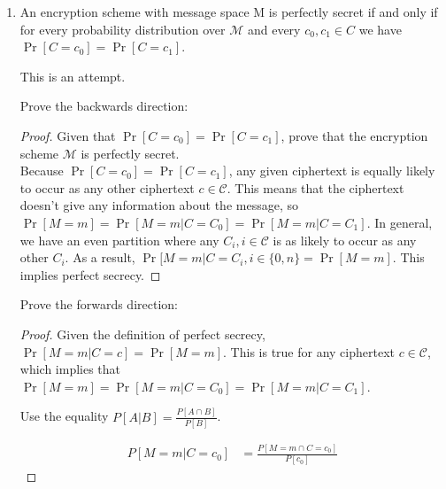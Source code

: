 \documentclass{article}
\begin{document}
\begin{enumerate}
\begin{enumerate}
\begin{proof}
        $\Pr[M = m | C = c] = P[M = m]$\newline

        This implies that $\Pr[M = m_0 | C = c] = \Pr[M = m_0]$ and $\Pr[M = m_1 | C = c] = \Pr[M = m_1]$. We then find that $\Pr[M = m_0 \mid C = c] =
          \Pr[M = m_0] \neq \Pr[M = m_1] = \Pr[M = m_1 \mid C = c]$ by the current probability distribution. This contradicts the initial assumption that $\Pr[M = m_1 | C = c] = \Pr[M = m_1 \mid C = c]$
        
        \end{proof}

      \item An encryption scheme with message space M is perfectly secret if and 
        only if for every probability distribution over $\mathcal{M}$ and every
        $c_0, c_1 \in C$ 
        we have $\Pr\left[C = c_0\right] = \Pr\left[C = c_1\right]$.

        This is an attempt.

        Prove the backwards direction:

        \begin{proof}
        Given that $\Pr\left[C = c_0\right] = \Pr\left[C = c_1\right]$, prove that the encryption scheme $\mathcal{M}$ is perfectly secret.\\

        Because $\Pr\left[C = c_0\right] = \Pr\left[C = c_1\right]$, any given ciphertext is equally likely to occur as any other ciphertext $c \in \mathcal{C}$. This means that the ciphertext doesn't give any information about the message, so $\Pr[M = m] = \Pr[M = m | C = C_0] = \Pr[M = m | C = C_1]$. In general, we have an even partition where any $C_i, i \in \mathcal{C}$ is as likely to occur as any other $C_i$. As a result, $\Pr[M = m | C = C_i, i \in \{0, n\} = \Pr[M = m]$. This implies perfect secrecy.
        \end{proof}

        Prove the forwards direction:

        \begin{proof}
        Given the definition of perfect secrecy,  $\Pr[M = m | C = c] = \Pr[M = m]$. This is true for any ciphertext $c \in \mathcal{C}$, which implies that $\Pr[M = m] = \Pr[M = m | C = C_0] = \Pr[M = m | C = C_1]$.

        Use the equality $P[A | B] = \frac{P[A \cap B]}{P[B]}$. 

        \begin{align*}
          P[M = m | C = c_0] &= \frac{P[M = m \cap C = c_0]}{P[c_0]}
        \end{align*}


\end{proof}
\end{enumerate}
\end{enumerate}
\end{document}
